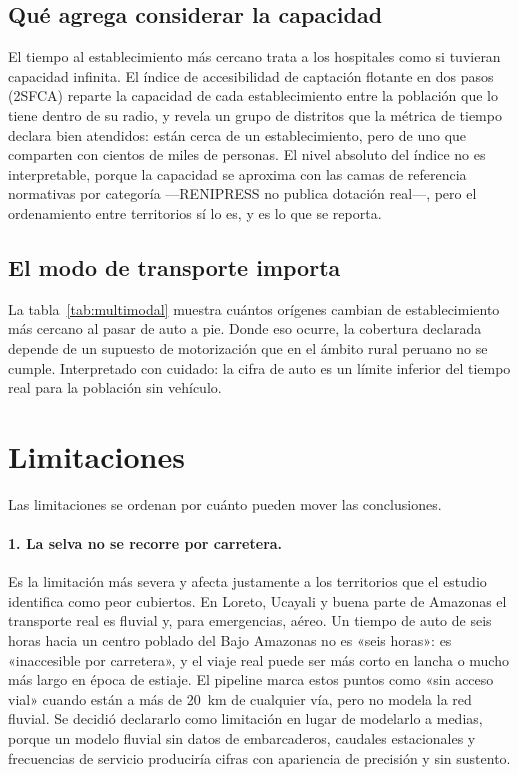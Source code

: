 \documentclass[10pt,a4paper]{article}
\begin{document}
\subsection{Qué agrega considerar la capacidad}

El tiempo al establecimiento más cercano trata a los hospitales como si tuvieran
capacidad infinita. El índice de accesibilidad de captación flotante en dos pasos
(2SFCA) reparte la capacidad de cada establecimiento entre la población que lo
tiene dentro de su radio, y revela un grupo de distritos que la métrica de tiempo
declara bien atendidos: están cerca de un establecimiento, pero de uno que
comparten con cientos de miles de personas. El nivel absoluto del índice no es
interpretable, porque la capacidad se aproxima con las camas de referencia
normativas por categoría —RENIPRESS no publica dotación real—, pero el
ordenamiento entre territorios sí lo es, y es lo que se reporta.

\subsection{El modo de transporte importa}

La tabla~\ref{tab:multimodal} muestra cuántos orígenes cambian de
establecimiento más cercano al pasar de auto a pie. Donde eso ocurre, la
cobertura declarada depende de un supuesto de motorización que en el ámbito
rural peruano no se cumple. Interpretado con cuidado: la cifra de auto es un
límite inferior del tiempo real para la población sin vehículo.

\section{Limitaciones}
\label{sec:limitaciones}

Las limitaciones se ordenan por cuánto pueden mover las conclusiones.

\paragraph{1. La selva no se recorre por carretera.}
Es la limitación más severa y afecta justamente a los territorios que el estudio
identifica como peor cubiertos. En Loreto, Ucayali y buena parte de Amazonas el
transporte real es fluvial y, para emergencias, aéreo. Un tiempo de auto de seis
horas hacia un centro poblado del Bajo Amazonas no es «seis horas»: es
«inaccesible por carretera», y el viaje real puede ser más corto en lancha o
mucho más largo en época de estiaje. El pipeline marca estos puntos como «sin
acceso vial» cuando están a más de \SI{20}{\kilo\metre} de cualquier vía, pero no modela
la red fluvial. Se decidió declararlo como limitación en lugar de modelarlo a
medias, porque un modelo fluvial sin datos de embarcaderos, caudales
estacionales y frecuencias de servicio produciría cifras con apariencia de
precisión y sin sustento.
\end{document}
